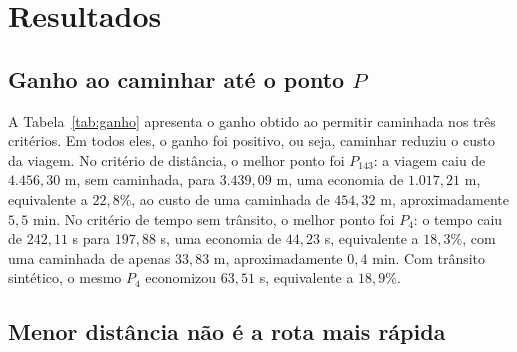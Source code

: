 \documentclass[conference]{IEEEtran}
\begin{document}
\section{Resultados}
\subsection{Ganho ao caminhar até o ponto $P$}

A Tabela~\ref{tab:ganho} apresenta o ganho obtido ao permitir caminhada nos três critérios. Em todos eles, o ganho foi positivo, ou seja, caminhar reduziu o custo da viagem. No critério de distância, o melhor ponto foi $P_{143}$: a viagem caiu de $4.456{,}30$ m, sem caminhada, para $3.439{,}09$ m, uma economia de $1.017{,}21$ m, equivalente a $22{,}8\%$, ao custo de uma caminhada de $454{,}32$ m, aproximadamente $5{,}5$ min. No critério de tempo sem trânsito, o melhor ponto foi $P_4$: o tempo caiu de $242{,}11$ s para $197{,}88$ s, uma economia de $44{,}23$ s, equivalente a $18{,}3\%$, com uma caminhada de apenas $33{,}83$ m, aproximadamente $0{,}4$ min. Com trânsito sintético, o mesmo $P_4$ economizou $63{,}51$ s, equivalente a $18{,}9\%$.

\begin{table}[H]
    \centering
    \caption{Ganho ao caminhar até o ponto $P$}
    \label{tab:ganho}
    \footnotesize
\end{table}

\subsection{Menor distância não é a rota mais rápida}
\end{document}
